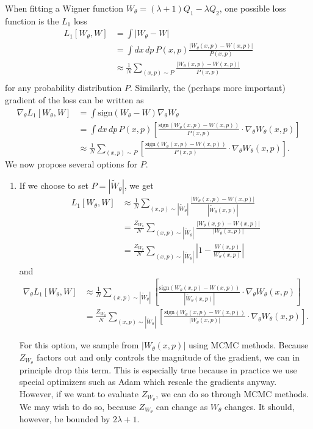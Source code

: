 \documentclass{article}
\begin{document}
When fitting a Wigner function $W_\theta = (\lambda+1)Q_1-\lambda Q_2$, one possible loss function is the $L_1$ loss \begin{align*}
    L_1[W_\theta,W] &= \int |W_\theta - W|\\
    &=\int dx\, dp\, P(x,p)\frac{|W_\theta(x,p) - W(x,p)|}{P(x,p)}\\
    &\approx \frac{1}{N}\sum_{(x,p)\sim P}\frac{|W_\theta(x,p) - W(x,p)|}{P(x,p)}\\
\end{align*} for any probability distribution $P$. Similarly, the (perhaps more important) gradient of the loss can be written as \begin{align*}
    \nabla_\theta L_1[W_\theta,W] &= \int \text{sign}(W_\theta - W) \nabla_\theta W_\theta\\
    &=\int dx\, dp\, P(x,p)\left[\frac{\text{sign}(W_\theta(x,p) - W(x,p))}{P(x,p)}\cdot \nabla_\theta W_\theta(x,p)\right]\\
    &\approx \frac{1}{N}\sum_{(x,p)\sim P}\left[\frac{\text{sign}(W_\theta(x,p) - W(x,p))}{P(x,p)}\cdot \nabla_\theta W_\theta(x,p)\right].
\end{align*} We now propose several options for $P$. \begin{enumerate}
    \item If we choose to set $P = |\widetilde{W}_\theta|$, we get \begin{align*}
        L_1[W_\theta,W] &\approx \frac{1}{N}\sum_{(x,p)\sim |\widetilde{W}_\theta|} \frac{|W_\theta(x,p) - W(x,p)|}{|\widetilde{W}_\theta(x,p)|}\\
        &= \frac{Z_{W_\theta}}{N}\sum_{(x,p)\sim |\widetilde{W}_\theta|} \frac{|W_\theta(x,p) - W(x,p)|}{|W_\theta (x,p)|}\\
        &= \frac{Z_{W_\theta}}{N}\sum_{(x,p)\sim |\widetilde{W}_\theta|} \left|1 - \frac{W(x,p)}{W_\theta (x,p)}\right|
    \end{align*} and \begin{align*}
        \nabla_\theta L_1[W_\theta,W] &\approx \frac{1}{N}\sum_{(x,p)\sim |\widetilde{W}_\theta|}\left[\frac{\text{sign}(W_\theta(x,p) - W(x,p))}{|\widetilde{W}_\theta(x,p)|}\cdot \nabla_\theta W_\theta(x,p)\right]\\
        &= \frac{Z_{W_\theta}}{N}\sum_{(x,p)\sim |\widetilde{W}_\theta|}\left[\frac{\text{sign}(W_\theta(x,p) - W(x,p))}{|W_\theta(x,p)|}\cdot \nabla_\theta W_\theta(x,p)\right].
    \end{align*} 
    
    For this option, we sample from $|W_\theta (x,p)|$ using MCMC methods. Because $Z_{W_\theta}$ factors out and only controls the magnitude of the gradient, we can in principle drop this term. This is especially true because in practice we use special optimizers such as Adam which rescale the gradients anyway. However, if we want to evaluate $Z_{W_\theta}$, we can do so through MCMC methods. We may wish to do so, because $Z_{W_\theta}$ can change as $W_\theta$ changes. It should, however, be bounded by $2\lambda + 1$.


\end{enumerate}
\end{document}
